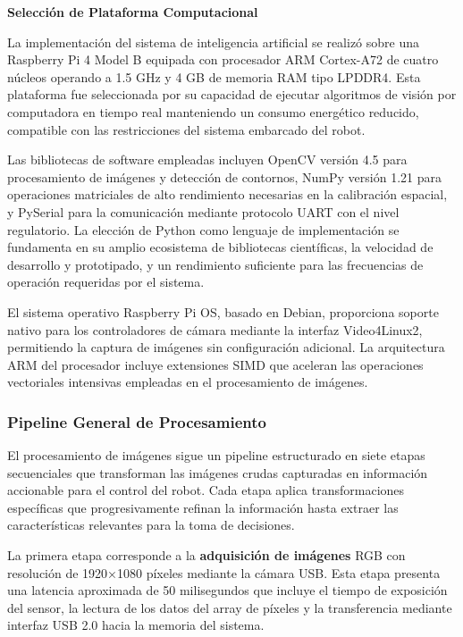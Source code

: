 \textbf{Selección de Plataforma Computacional}

La implementación del sistema de inteligencia artificial se realizó sobre una Raspberry Pi 4 Model B equipada con procesador ARM Cortex-A72 de cuatro núcleos operando a 1.5 GHz y 4 GB de memoria RAM tipo LPDDR4. Esta plataforma fue seleccionada por su capacidad de ejecutar algoritmos de visión por computadora en tiempo real manteniendo un consumo energético reducido, compatible con las restricciones del sistema embarcado del robot.

Las bibliotecas de software empleadas incluyen OpenCV versión 4.5 para procesamiento de imágenes y detección de contornos, NumPy versión 1.21 para operaciones matriciales de alto rendimiento necesarias en la calibración espacial, y PySerial para la comunicación mediante protocolo UART con el nivel regulatorio. La elección de Python como lenguaje de implementación se fundamenta en su amplio ecosistema de bibliotecas científicas, la velocidad de desarrollo y prototipado, y un rendimiento suficiente para las frecuencias de operación requeridas por el sistema.

El sistema operativo Raspberry Pi OS, basado en Debian, proporciona soporte nativo para los controladores de cámara mediante la interfaz Video4Linux2, permitiendo la captura de imágenes sin configuración adicional. La arquitectura ARM del procesador incluye extensiones SIMD que aceleran las operaciones vectoriales intensivas empleadas en el procesamiento de imágenes.

\subsubsection{Pipeline General de Procesamiento}

El procesamiento de imágenes sigue un pipeline estructurado en siete etapas secuenciales que transforman las imágenes crudas capturadas en información accionable para el control del robot. Cada etapa aplica transformaciones específicas que progresivamente refinan la información hasta extraer las características relevantes para la toma de decisiones.

La primera etapa corresponde a la \textbf{adquisición de imágenes} RGB con resolución de 1920×1080 píxeles mediante la cámara USB. Esta etapa presenta una latencia aproximada de 50 milisegundos que incluye el tiempo de exposición del sensor, la lectura de los datos del array de píxeles y la transferencia mediante interfaz USB 2.0 hacia la memoria del sistema.

